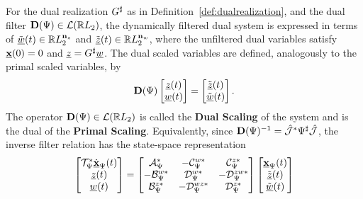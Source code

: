 \begin{definition}\label{def:dualscaledsys:iqc}
    For the dual realization $G^\sharp$ as in Definition~\ref{def:dualrealization}, and the dual
    filter $\mathbf{D}(\Psi)\in\mathcal{L}(\mathbb{R} L_2)$, the dynamically filtered dual system is expressed
    in terms of $\tilde{\underline{w}}(t)\in\mathbb{R} L_2^{\mathbf{n}_z}$ and
    $\tilde{\underline{z}}(t)\in\mathbb{R} L_2^{\mathbf{n}_w}$, where the unfiltered dual variables satisfy
    $\underline{\mathbf{x}}(0)=0$ and $\underline{z}=G^\sharp\underline{w}$.
    The dual scaled variables are defined, analogously to the primal scaled variables, by
    \begin{equation}\label{eqn:dualscaling:iqc}
        \mathbf{D}(\Psi)
        \begin{bmatrix}\underline{z}(t) \\ \underline{w}(t)\end{bmatrix} = 
        \begin{bmatrix}\tilde{\underline{z}}(t) \\ \tilde{\underline{w}}(t)\end{bmatrix}.
    \end{equation}
    The operator $\mathbf{D}(\Psi)\in\mathcal{L}(\mathbb{R} L_2)$ is called the \textbf{Dual Scaling} of the system 
    and is the dual of the \textbf{Primal Scaling}.
    Equivalently, since $\mathbf{D}(\Psi)^{-1}=\hat{\mathcal{J}}^*\Psi^\sharp\hat{\mathcal{J}}$, the inverse
    filter relation has the state-space representation
    \begin{equation}\label{eqn:ssdualscaling:iqc}
        \begin{bmatrix}\mathcal{T}_{\Psi}^*\dot{\underline{\mathbf{x}}}_{\Psi}(t)\\ \underline{z}(t) \\ \underline{w}(t)\end{bmatrix}
        =
        \begin{bmatrix}\mathcal{A}_\Psi^* & -\mathcal{C}_\Psi^{w*} & \mathcal{C}_\Psi^{z*} \\
            -\mathcal{B}_\Psi^{w*} & \mathcal{D}_\Psi^{w*} & -\mathcal{D}_\Psi^{zw*} \\
            \mathcal{B}_\Psi^{z*} & -\mathcal{D}_\Psi^{wz*} & \mathcal{D}_\Psi^{z*}\end{bmatrix}
            \begin{bmatrix}\underline{\mathbf{x}}_\Psi(t) \\ \tilde{\underline{z}}(t) \\ \tilde{\underline{w}}(t)\end{bmatrix}
    \end{equation}
\end{definition}

